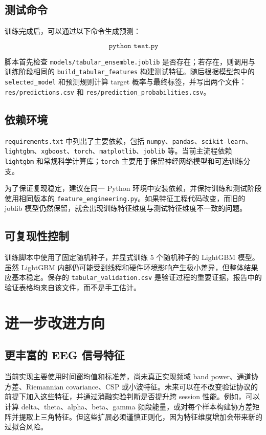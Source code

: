 \section{测试命令}

训练完成后，可以通过以下命令生成预测：

\[
\texttt{python test.py}
\]

脚本首先检查 \texttt{models/tabular\_ensemble.joblib} 是否存在；若存在，则调用与训练阶段相同的 \texttt{build\_tabular\_features} 构建测试特征。随后根据模型包中的 \texttt{selected\_model} 和预测规则计算 target 概率与最终标签，并写出两个文件：\texttt{res/predictions.csv} 和 \texttt{res/prediction\_probabilities.csv}。

\section{依赖环境}

\texttt{requirements.txt} 中列出了主要依赖，包括 \texttt{numpy}、\texttt{pandas}、\texttt{scikit-learn}、\texttt{lightgbm}、\texttt{xgboost}、\texttt{torch}、\texttt{matplotlib}、\texttt{joblib} 等。当前主流程依赖 \texttt{lightgbm} 和常规科学计算库；\texttt{torch} 主要用于保留神经网络模型和可选训练分支。

为了保证复现稳定，建议在同一 Python 环境中安装依赖，并保持训练和测试阶段使用相同版本的 \texttt{feature\_engineering.py}。如果特征工程代码改变，而旧的 joblib 模型仍然保留，就会出现训练特征维度与测试特征维度不一致的问题。

\section{可复现性控制}

训练脚本中使用了固定随机种子，并显式训练 5 个随机种子的 LightGBM 模型。虽然 LightGBM 内部仍可能受到线程和硬件环境影响产生极小差异，但整体结果应基本稳定。保存的 \texttt{tabular\_validation.csv} 是验证过程的重要证据，报告中的验证表格均来自该文件，而不是手工估计。

\chapter{进一步改进方向}

\section{更丰富的 EEG 信号特征}

当前实现主要使用时间窗均值和标准差，尚未真正实现频域 band power、通道协方差、Riemannian covariance、CSP 或小波特征。未来可以在不改变验证协议的前提下加入这些特征，并通过消融实验判断是否提升跨 session 性能。例如，可以计算 delta、theta、alpha、beta、gamma 频段能量，或对每个样本构建协方差矩阵并提取上三角特征。但这些扩展必须谨慎正则化，因为特征维度增加会带来新的过拟合风险。

